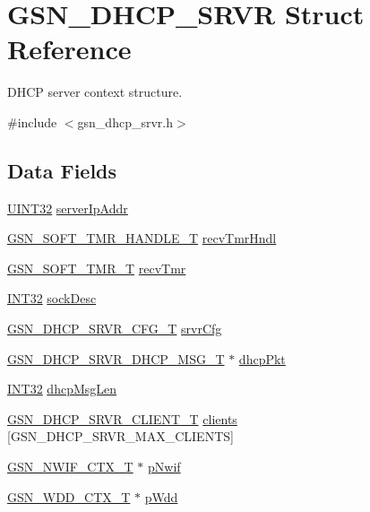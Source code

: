 \hypertarget{a00043}{
\section{GSN\_\-DHCP\_\-SRVR Struct Reference}
\label{a00043}
}


DHCP server context structure.  




{\ttfamily \#include $<$gsn\_\-dhcp\_\-srvr.h$>$}

\subsection*{Data Fields}
\begin{DoxyCompactItemize}
\item 
\hyperlink{a00660_gae1e6edbbc26d6fbc71a90190d0266018}{UINT32} \hyperlink{a00043_a09261ac30de0001f89753c8f3869ad2f}{serverIpAddr}
\item 
\hyperlink{a00229}{GSN\_\-SOFT\_\-TMR\_\-HANDLE\_\-T} \hyperlink{a00043_a99352b33eae768a9ac49ad9cd195a03f}{recvTmrHndl}
\item 
\hyperlink{a00229}{GSN\_\-SOFT\_\-TMR\_\-T} \hyperlink{a00043_aceccc0d31027efd5c8c774981cb782f3}{recvTmr}
\item 
\hyperlink{a00660_ga63021d67d54286c2163bcdb43a6f2569}{INT32} \hyperlink{a00043_a4664a1e7fa506ea9a7864c6847d8af4b}{sockDesc}
\item 
\hyperlink{a00044}{GSN\_\-DHCP\_\-SRVR\_\-CFG\_\-T} \hyperlink{a00043_a68dcf77b495ff3cbf9a6ef828ce8542e}{srvrCfg}
\item 
\hyperlink{a00046}{GSN\_\-DHCP\_\-SRVR\_\-DHCP\_\-MSG\_\-T} $\ast$ \hyperlink{a00043_ac271af693c1a7a5d647f0f1b76e2e633}{dhcpPkt}
\item 
\hyperlink{a00660_ga63021d67d54286c2163bcdb43a6f2569}{INT32} \hyperlink{a00043_ada3b5c6b062e8c88e941dd4fd6cd85b6}{dhcpMsgLen}
\item 
\hyperlink{a00045}{GSN\_\-DHCP\_\-SRVR\_\-CLIENT\_\-T} \hyperlink{a00043_a9cd6bdb415f7200b23fd5e9a2c9cf5e7}{clients} \mbox{[}GSN\_\-DHCP\_\-SRVR\_\-MAX\_\-CLIENTS\mbox{]}
\item 
\hyperlink{a00167}{GSN\_\-NWIF\_\-CTX\_\-T} $\ast$ \hyperlink{a00043_a98d510676ecd134a5e9ac61bf222cded}{pNwif}
\item 
\hyperlink{a00108}{GSN\_\-WDD\_\-CTX\_\-T} $\ast$ \hyperlink{a00043_a97684b58b7a05f9b282a86a26929e1ba}{pWdd}
\end{DoxyCompactItemize}


